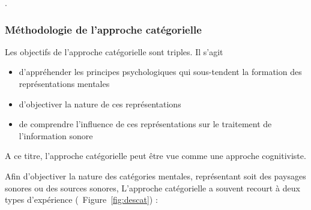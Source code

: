 .\\

\subsubsection{Méthodologie de l'approche catégorielle}
\label{sec:appCategorielle}

Les objectifs de l'approche catégorielle sont triples. Il s'agit 

\begin{itemize}
\item d'appréhender les principes psychologiques qui sous-tendent la formation des représentations mentales
\item d'objectiver la nature de ces représentations
\item de comprendre l'influence de ces représentations sur le traitement de l'information sonore
\end{itemize}
 
A ce titre, l'approche catégorielle peut être vue comme une approche cognitiviste. 

Afin d'objectiver la nature des catégories mentales, représentant soit des paysages sonores ou des sources sonores, L'approche catégorielle a souvent recourt à deux types d'expérience (\Cf~Figure~\ref{fig:descat}) :

